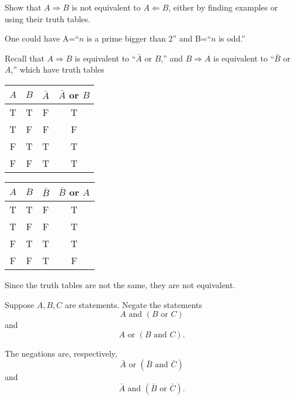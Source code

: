 \documentclass[11pt,dvipsnames]{book}
\numberwithin{figure}{section} %
\numberwithin{table}{section} %
\begin{document}
\begin{exercise}
Show that $A\Rightarrow B$ is not equivalent to $A\Leftarrow B$, either by finding examples or using their truth tables.
\begin{solution}
One could have A=``$n$ is a prime bigger than 2'' and B=``$n$ is odd.''

Recall that $A\Rightarrow B$ is equivalent to ``$\bar{A}$ or $B$,'' and  $B\Rightarrow A$ is equivalent to ``$\bar{B}$ or $A$,'' which have truth tables
\begin{center}
\begin{multicols}{2}
\begin{tabular}{ c|c|c|c}
$A$ & $B$ & $\bar{A}$ & $\bar{A}$ or ${B}$  \\ \hline
T & T & F  & T \\
T & F & F  & F \\
F & T & T  & T \\
F & F &  T  &  T \\
\end{tabular}

\begin{tabular}{ c|c|c|c}
$A$ & $B$ & $\bar{B}$ & $\bar{B}$ or ${A}$  \\ \hline
T & T & F  & T \\
T & F & F  & T \\
F & T & T  & T \\
F & F &  T  &  F \\
\end{tabular}

\end{multicols}
Since the truth tables are not the same, they are not equivalent.

\end{center}

\end{solution}
\end{exercise}

\begin{exercise}
Suppose $A,B,C$ are statements. Negate the statements
\[
A\mbox{ and }(B \mbox{ or }C)\]
and
\[
A\mbox{ or }(B \mbox{ and }C)
.
\]
\begin{solution}
The negations are, respectively,
\[
\bar{A} \mbox{ or } (\bar{B}\mbox{ and }\bar{C})
\]
and
\[
\bar{A} \mbox{ and } (\bar{B}\mbox{ or }\bar{C}).
\]
\end{solution}

\end{exercise}
\end{document}
